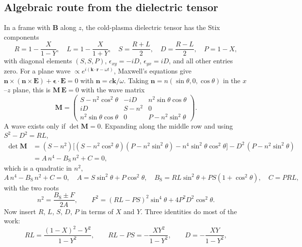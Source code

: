 \documentclass[11pt,a4paper]{article}
\newcommand{\vect}[1]{\bm{#1}}
\begin{document}
\subsection{Algebraic route from the dielectric tensor}
In a frame with $\vect B$ along $z$, the cold-plasma dielectric tensor has the Stix components
\begin{equation}
  R=1-\frac{X}{1-Y},\quad L=1-\frac{X}{1+Y},\quad S=\frac{R+L}{2},\quad D=\frac{R-L}{2},\quad P=1-X,
\end{equation}
with diagonal elements $(S,S,P)$, $\epsilon_{xy}=-iD$, $\epsilon_{yx}=iD$, and all other entries zero.
For a plane wave $\propto e^{i(\vect k\cdot\vect r-\omega t)}$, Maxwell's equations give
$\vect n\times(\vect n\times\vect E)+\boldsymbol\epsilon\cdot\vect E=0$ with $\vect n=c\vect k/\omega$. Taking $\vect n=n(\sin\theta,0,\cos\theta)$ in the $x$--$z$ plane, this is
$\mathbf M\,\vect E=0$ with the wave matrix
\begin{equation}
  \mathbf M=\begin{pmatrix}
    S-n^2\cos^2\theta & -iD & n^2\sin\theta\cos\theta\\
    iD & S-n^2 & 0\\
    n^2\sin\theta\cos\theta & 0 & P-n^2\sin^2\theta
  \end{pmatrix}.
\end{equation}
A wave exists only if $\det\mathbf M=0$. Expanding along the middle row and using $S^2-D^2=RL$,
\begin{align}
  \det\mathbf M&=(S-n^2)\Big[(S-n^2\cos^2\theta)(P-n^2\sin^2\theta)-n^4\sin^2\theta\cos^2\theta\Big]
              -D^2\,(P-n^2\sin^2\theta)\nonumber\\
  &=A\,n^4-B_\text{S}\,n^2+C=0,
\end{align}
which is a quadratic in $n^2$,
\begin{equation}
  A\,n^4-B_\text{S}\,n^2+C=0,\quad
  A=S\sin^2\theta+P\cos^2\theta,\quad
  B_\text{S}=RL\sin^2\theta+PS(1+\cos^2\theta),\quad
  C=PRL,
\end{equation}
with the two roots
\begin{equation}
  n^2=\frac{B_\text{S}\pm F}{2A},\qquad F^2=(RL-PS)^2\sin^4\theta+4P^2D^2\cos^2\theta .
\end{equation}
Now insert $R$, $L$, $S$, $D$, $P$ in terms of $X$ and $Y$. Three identities do most of the work:
\begin{equation}
  RL=\frac{(1-X)^2-Y^2}{1-Y^2},\qquad RL-PS=-\frac{XY^2}{1-Y^2},\qquad D=-\frac{XY}{1-Y^2},
\end{equation}
\end{document}
